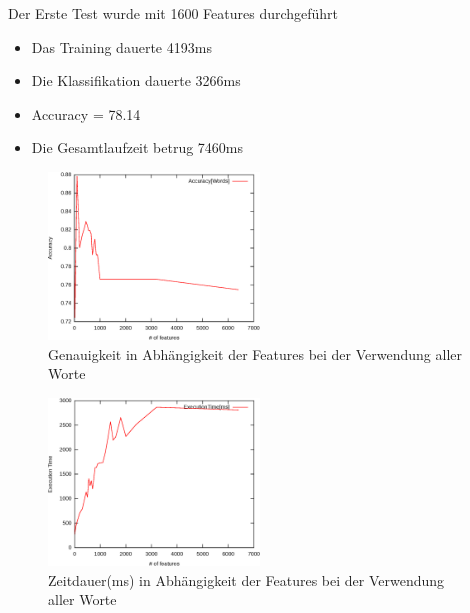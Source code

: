 \begin{frame}[c]
\begin{itemize}
  \fatitem Der Erste Test wurde mit 1600 Features durchgeführt
  \begin{itemize}
    \item Das Training dauerte 4193ms
    \item Die Klassifikation dauerte 3266ms
    \item Accuracy = 78.14%
    \item Die Gesamtlaufzeit betrug 7460ms
  \end{itemize}
\end{itemize}
\end{frame}



\begin{frame}[c]
\begin{figure}[htp]
\begin{center}
  \includegraphics[width=0.5\textwidth]{graphics/accuracy_tokens}
  \caption[labelInTOC]{Genauigkeit in Abhängigkeit der Features bei der
  Verwendung aller Worte}
  \label{fig:tokenAccuracy}
\end{center}
\end{figure}
\end{frame}
	
	\begin{frame}[c]
\begin{figure}[htp]
\begin{center}
  \includegraphics[width=0.5\textwidth]{graphics/exec_tokens}
  \caption[labelInTOC]{Zeitdauer(ms) in Abhängigkeit der Features bei der
  Verwendung aller Worte}
  \label{fig:tokenAccuracy}
\end{center}
\end{figure}
\end{frame}
	
